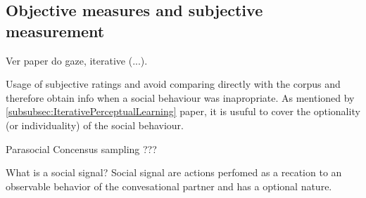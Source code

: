 \subsection{Objective measures and subjective measurement}
Ver paper do gaze, iterative (...).

Usage of subjective ratings and avoid comparing directly with the corpus and therefore obtain info when a social behaviour was inapropriate. As mentioned by \ref{subsubsec:IterativePerceptualLearning} paper, it is usuful to cover the optionality (or individuality) of the social behaviour.

Parasocial Concensus sampling ???

What is a social signal?
Social signal are actions perfomed as a recation to an observable behavior of the convesational partner and has a optional nature.